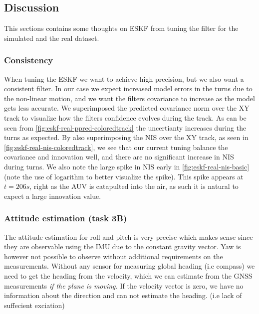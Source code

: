 \subsection{Discussion}
This sections contains some thoughts on ESKF from tuning the filter for the simulated and the real dataset.



\subsubsection{Consistency}
When tuning the ESKF we want to achieve high precision, but we also want a consistent filter. In our case we expect increased model errors in the turns due to the non-linear motion, and we want the filters covariance to increase as the model gets less accurate. We superimposed the predicted covariance norm over the XY track to visualize how the filters confidence evolves during the track. As can be seen from \cref{fig:eskf-real-ppred-coloredtrack} the uncertianty increases during the turns as expected. By also superimposing the NIS over the XY track, as seen in \cref{fig:eskf-real-nis-coloredtrack}, we see that our current tuning balance the covariance and innovation well, and there are no significant increase in NIS during turns. 
We also note the large spike in NIS early in \cref{fig:eskf-real-nis-basic} (note the use of logarithm to better visualize the spike). This spike appears at $t=206s$, right as the AUV is catapulted into the air, as such it is natural to expect a large innovation value.

\subsubsection{Attitude estimation (task 3B)}
The attitude estimation for roll and pitch is very precise which makes sense since they are observable using the IMU due to the constant gravity vector. Yaw is however not possible to observe without additional requirements on the measurements. Without any sensor for measuring global heading (i.e compass) we need to get the heading from the velocity, which we can estimate from the GNSS measurements \textit{if the plane is moving.} If the velocity vector is zero, we have no information about the direction and can not estimate the heading. (i.e lack of suffecient exciation) 

